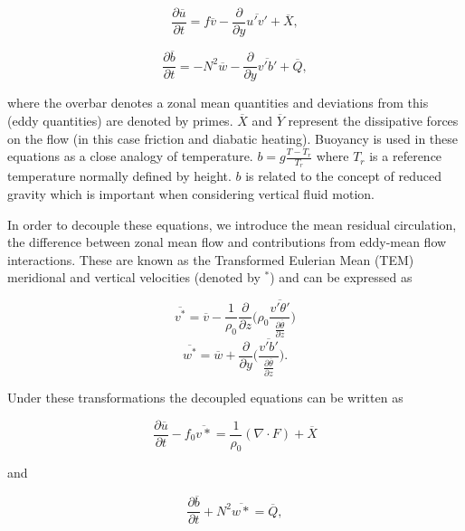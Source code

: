 \begin{equation} \label{eq:QG_Ubar}
\frac{\partial \overline{u}}{\partial t} = f\overline{v} - \frac{\partial}{\partial y} \overline{u'v'} + \overline{X}, 
\end{equation}

\begin{equation} \label{eq:QG_theta}
\frac{\partial \overline{b}}{\partial t} = -N^2\overline{w} - \frac{\partial}{\partial y} \overline{v'b'} + \overline{Q}, 
\end{equation}

\noindent where the overbar denotes a zonal mean quantities and deviations from this (eddy quantities) are denoted by primes. $\overline{X}$ and $\overline{Y}$ represent the dissipative forces on the flow (in this case friction and diabatic heating). Buoyancy is used in these equations as a close analogy of temperature. $b = g\frac{T - T_r}{T_r}$ where $T_r$ is a reference temperature normally defined by height. $b$ is related to the concept of reduced gravity which is important when considering vertical fluid motion. 

In order to decouple these equations, we introduce the mean residual circulation, the difference between zonal mean flow and contributions from eddy-mean flow interactions. These are known as the Transformed Eulerian Mean (TEM) meridional and vertical velocities \citep{andrewsPlanetary1976} (denoted by $^*$) and can be expressed as 

\begin{equation} \label{eq:V*}
\overline{v^*} = \overline{v} - \frac{1}{\rho_0}\frac{\partial}{\partial z} \bigg(\rho_0 \frac{\overline{v'\theta'}}{\frac{\partial{\overline{\theta}}}{\partial{z}}}\bigg)
\end{equation}\break
\begin{equation} \label{eq:W*}
\overline{w^*} = \overline{w} + \frac{\partial}{\partial y} \bigg( \frac{\overline{v'b'}}{\frac{\partial{\overline{\theta}}}{\partial{z}}}\bigg).
\end{equation}

Under these transformations the decoupled equations can be written as

\begin{equation} \label{eq:decoupled_U}
\frac{\partial \overline{u}}{\partial t} - f_0 \overline{v*} = \frac{1}{\rho_0} (\nabla \cdot F) + \overline{X}
\end{equation}

and

\begin{equation} \label{eq:decoupled_b}
\frac{\partial \overline{b}}{\partial t} + N^2 \overline{w*} = \overline{Q},
\end{equation}

